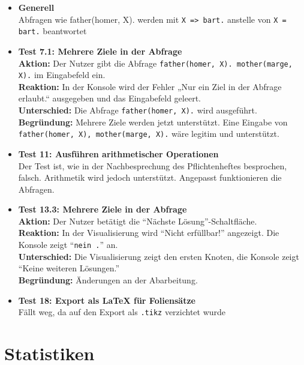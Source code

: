 \documentclass[parskip=full,11pt,twoside]{scrartcl}
\begin{document}
\begin{itemize}
\item \textbf{Generell}\\
	Abfragen wie father(homer, X). werden mit \texttt{X => bart.} anstelle von \texttt{X = bart.} beantwortet
		
\item \textbf{Test 7.1: Mehrere Ziele in der Abfrage}\\
	\textbf{Aktion:} Der Nutzer gibt die Abfrage \texttt{father(homer, X). mother(marge, X).} im Eingabefeld ein.\\
	\textbf{Reaktion:} In der Konsole wird der Fehler „Nur ein Ziel in der Abfrage erlaubt.“ ausgegeben und das Eingabefeld geleert.\\
	\textbf{Unterschied:} Die Abfrage \texttt{father(homer, X).} wird ausgeführt.\\
	\textbf{Begründung:} Mehrere Ziele werden jetzt unterstützt. Eine Eingabe von \texttt{father(homer, X), mother(marge, X).} wäre legitim und unterstützt.
	
\item \textbf{Test 11: Ausführen arithmetischer Operationen}\\
	Der Test ist, wie in der Nachbesprechung des Pflichtenheftes besprochen, falsch.
	Arithmetik wird jedoch unterstützt. Angepasst funktionieren die Abfragen.
	
\item \textbf{Test 13.3: Mehrere Ziele in der Abfrage}\\
	\textbf{Aktion:} Der Nutzer betätigt die \enquote{Nächste Lösung}-Schaltfläche.\\
	\textbf{Reaktion:} In der Visualisierung wird \enquote{Nicht erfüllbar!} angezeigt. Die Konsole zeigt \enquote{\texttt{nein .}} an.\\
	\textbf{Unterschied:} Die Visualisierung zeigt den ersten Knoten, die Konsole zeigt \enquote{Keine weiteren Lösungen.}\\
	\textbf{Begründung:} Änderungen an der Abarbeitung.
	
\item \textbf{Test 18: Export als LaTeX für Foliensätze}\\
	Fällt weg, da auf den Export als \texttt{.tikz} verzichtet wurde\\
\end{itemize}

\section{Statistiken}

\end{document}
